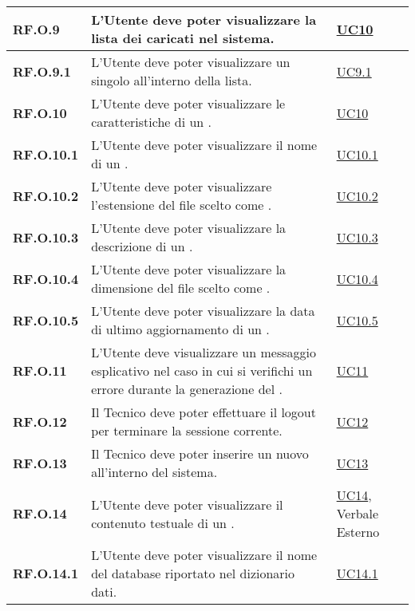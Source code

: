 \begin{longtable}{|P{3cm}|P{6,5cm}|>{\arraybackslash}P{4cm}|}
    \hline
    \textbf{RF.O.9} & L'Utente deve poter visualizzare la lista dei  caricati nel sistema. & \hyperref[UC10]{UC10}\\
    \hline
    \textbf{RF.O.9.1} & L'Utente deve poter visualizzare un singolo  all'interno della lista. & \hyperref[UC9point1]{UC9.1}\\
    \hline
    \textbf{RF.O.10} & L'Utente deve poter visualizzare le caratteristiche di un . & \hyperref[UC10]{UC10}\\
    \hline
    \textbf{RF.O.10.1} & L'Utente deve poter visualizzare il nome di un . & \hyperref[UC10point1]{UC10.1}\\
    \hline
    \textbf{RF.O.10.2} & L'Utente deve poter visualizzare l'estensione del file scelto come . & \hyperref[UC10point2]{UC10.2}\\
    \hline
    \textbf{RF.O.10.3} & L'Utente deve poter visualizzare la descrizione di un . & \hyperref[UC10point3]{UC10.3}\\
    \hline
    \textbf{RF.O.10.4} & L'Utente deve poter visualizzare la dimensione del file scelto come . & \hyperref[UC10point4]{UC10.4}\\
    \hline
    \textbf{RF.O.10.5} & L'Utente deve poter visualizzare la data di ultimo aggiornamento di un . & \hyperref[UC10point5]{UC10.5}\\
    \hline
    \textbf{RF.O.11} & L'Utente deve visualizzare un messaggio esplicativo nel caso in cui si verifichi un errore durante la generazione del . & \hyperref[UC11]{UC11}\\
    \hline
    \textbf{RF.O.12} & Il Tecnico deve poter effettuare il logout per terminare la sessione corrente. & \hyperref[UC12]{UC12}\\
    \hline
    \textbf{RF.O.13} & Il Tecnico deve poter inserire un nuovo  all'interno del sistema. & \hyperref[UC13]{UC13}\\
    \hline
    \textbf{RF.O.14} & L'Utente deve poter visualizzare il contenuto testuale di un . & \hyperref[UC14]{UC14}, Verbale Esterno\\
    \hline
    \textbf{RF.O.14.1} & L'Utente deve poter visualizzare il nome del database riportato nel dizionario dati. & \hyperref[UC14point1]{UC14.1}\\

\end{longtable}
